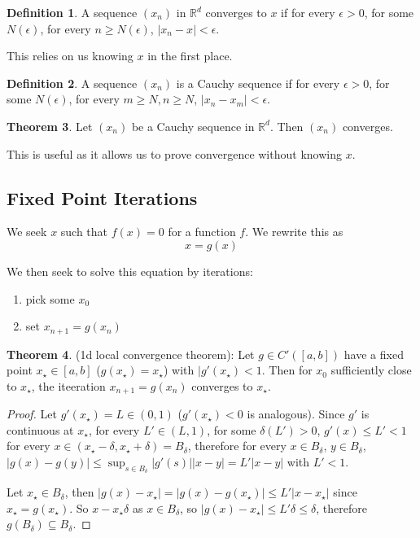 \documentclass[12pt,a4paper]{article}
\theoremstyle{definition}
\newtheorem{definition}{Definition}[subsection]
\newtheorem{theorem}[definition]{Theorem}
\begin{document}
\begin{definition}
	A sequence $(x_n)$ in $\mathbb{R}^d$ converges to $x$ if for every $\epsilon > 0$, for some $N(\epsilon)$, for every $n \ge N(\epsilon)$, $|x_n - x| < \epsilon$.

	This relies on us knowing $x$ in the first place.
\end{definition}

\begin{definition}
	A sequence $(x_n)$ is a Cauchy sequence if for every $\epsilon > 0$, for some $N(\epsilon)$, for every $m \ge N, n \ge N$, $|x_n - x_m| < \epsilon$.
\end{definition}


\begin{theorem}
	Let $(x_n)$ be a Cauchy sequence in $\mathbb{R}^d$. Then $(x_n)$ converges.
\end{theorem}

This is useful as it allows us to prove convergence without knowing $x$.

\subsection{Fixed Point Iterations}

We seek $x$ such that $f(x) = 0$ for a function $f$. We rewrite this as \[x = g(x)\]

We then seek to solve this equation by iterations:

\begin{enumerate}
	\item pick some $x_0$
	\item set $x_{n + 1} = g(x_n)$
\end{enumerate}

\begin{theorem}
	(1d local convergence theorem): Let $g \in C'([a, b])$ have a fixed point $x_{\star} \in [a, b]$ ($g(x_{\star}) = x_{\star}$) with $|g'(x_{\star}) < 1$. Then for $x_0$ sufficiently close to $x_{\star}$, the iteeration $x_{n + 1} = g(x_n)$ converges to $x_{\star}$.
\end{theorem}

\begin{proof}
	Let $g'(x_{\star}) = L \in (0, 1)$ ($g'(x_{\star}) < 0$ is analogous). Since $g'$ is continuous at $x_{\star}$, for every $L' \in (L, 1)$, for some $\delta(L') > 0$, $g'(x) \le L' < 1$ for every $x \in (x_{\star} - \delta, x_{\star} + \delta) = B_{\delta}$, therefore for every $x \in B_{\delta}$, $y \in B_{\delta}$, $|g(x) - g(y)| \le \sup_{s \in B_{\delta}} |g'(s)| |x - y| = L' |x - y|$ with $L' < 1$.

	Let $x_{\star} \in B_{\delta}$, then $|g(x) - x_{\star}| = |g(x) - g(x_{\star})| \le L' |x - x_{\star}|$ since $x_{\star} = g(x_{\star})$. So $x - x_{\star} \delta$ as $x \in B_{\delta}$, so $|g(x) - x_{\star}| \le L'\delta \le \delta$, therefore $g(B_\delta) \subseteq B_{\delta}$.
\end{proof}
\end{document}
